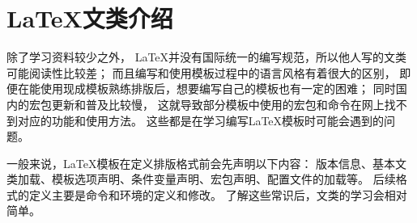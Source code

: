 \chapter{\LaTeX 文类介绍}
除了学习资料较少之外，
\LaTeX 并没有国际统一的编写规范，所以他人写的文类可能阅读性比较差；
而且编写和使用模板过程中的语言风格有着很大的区别，
即便在能使用现成模板熟练排版后，想要编写自己的模板也有一定的困难；
同时国内的宏包更新和普及比较慢，
这就导致部分模板中使用的宏包和命令在网上找不到对应的功能和使用方法。
这些都是在学习编写\LaTeX 模板时可能会遇到的问题。

一般来说，\LaTeX 模板在定义排版格式前会先声明以下内容：
版本信息、基本文类加载、模板选项声明、条件变量声明、宏包声明、配置文件的加载等。
后续格式的定义主要是命令和环境的定义和修改。
了解这些常识后，文类的学习会相对简单。

